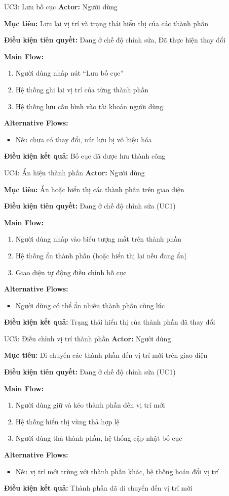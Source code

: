 \documentclass[12pt,a4paper]{article}
\newcommand{\usecasefield}[2]{%
    \textbf{#1:} #2 \par\vspace{2pt}
}
\newenvironment{mainflow}{
    \par\vspace{4pt}
    \textbf{Main Flow:}
    \begin{enumerate}[leftmargin=*, label=\arabic*., itemsep=2pt]
}{
    \end{enumerate}
}
\newenvironment{altflow}{
    \par\vspace{4pt}
    \textbf{Alternative Flows:}
    \begin{itemize}[leftmargin=*, label=\textendash, itemsep=2pt]
}{
    \end{itemize}
}
\begin{document}
\begin{usecase}{UC3: Lưu bố cục}
    \usecasefield{Actor}{Người dùng}
    \usecasefield{Mục tiêu}{Lưu lại vị trí và trạng thái hiển thị của các thành phần}
    \usecasefield{Điều kiện tiên quyết}{Đang ở chế độ chỉnh sửa, Đã thực hiện thay đổi}
    \begin{mainflow}
        \item Người dùng nhấp nút ``Lưu bố cục''
        \item Hệ thống ghi lại vị trí của từng thành phần
        \item Hệ thống lưu cấu hình vào tài khoản người dùng
    \end{mainflow}
    \begin{altflow}
        \item Nếu chưa có thay đổi, nút lưu bị vô hiệu hóa
    \end{altflow}
    \usecasefield{Điều kiện kết quả}{Bố cục đã được lưu thành công}
\end{usecase}

\begin{usecase}{UC4: Ẩn hiện thành phần}
    \usecasefield{Actor}{Người dùng}
    \usecasefield{Mục tiêu}{Ẩn hoặc hiển thị các thành phần trên giao diện}
    \usecasefield{Điều kiện tiên quyết}{Đang ở chế độ chỉnh sửa (UC1)}
    \begin{mainflow}
        \item Người dùng nhấp vào biểu tượng mắt trên thành phần
        \item Hệ thống ẩn thành phần (hoặc hiển thị lại nếu đang ẩn)
        \item Giao diện tự động điều chỉnh bố cục
    \end{mainflow}
    \begin{altflow}
        \item Người dùng có thể ẩn nhiều thành phần cùng lúc
    \end{altflow}
    \usecasefield{Điều kiện kết quả}{Trạng thái hiển thị của thành phần đã thay đổi}
\end{usecase}

\begin{usecase}{UC5: Điều chỉnh vị trí thành phần}
    \usecasefield{Actor}{Người dùng}
    \usecasefield{Mục tiêu}{Di chuyển các thành phần đến vị trí mới trên giao diện}
    \usecasefield{Điều kiện tiên quyết}{Đang ở chế độ chỉnh sửa (UC1)}
    \begin{mainflow}
        \item Người dùng giữ và kéo thành phần đến vị trí mới
        \item Hệ thống hiển thị vùng thả hợp lệ
        \item Người dùng thả thành phần, hệ thống cập nhật bố cục
    \end{mainflow}
    \begin{altflow}
        \item Nếu vị trí mới trùng với thành phần khác, hệ thống hoán đổi vị trí
    \end{altflow}
    \usecasefield{Điều kiện kết quả}{Thành phần đã di chuyển đến vị trí mới}
\end{usecase}
\end{document}
